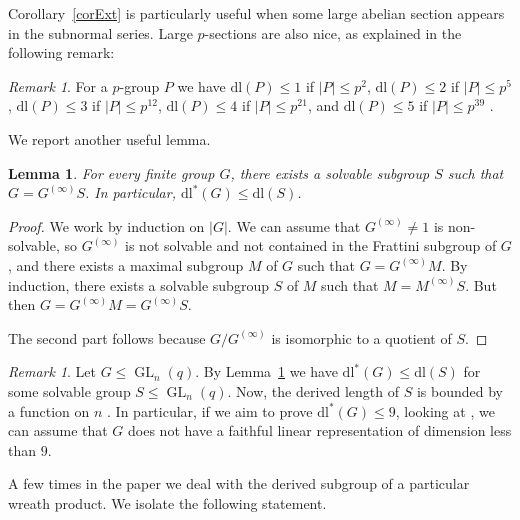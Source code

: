 \documentclass[11pt]{amsart}
\numberwithin{equation}{section}
\newtheorem{lemma}[theorem]{Lemma}
\theoremstyle{definition}
\theoremstyle{remark}
\newtheorem{remark}[theorem]{Remark}
\DeclareMathOperator{\GL}{GL}
\newcommand{\dll}{\mathrm{dl^*}}
\newcommand{\dl}{\mathrm{dl}}
\begin{document}
Corollary~\ref{corExt} is particularly useful when some large abelian section appears in the subnormal series. Large $p$-sections are also nice, as explained in the following remark:

\begin{remark} \label{remP}
For a $p$-group $P$ we have $\dl(P) \leq 1$ if $|P| \leq p^2$,
$\dl(P) \leq 2$ if $|P| \leq p^5$,
$\dl(P) \leq 3$ if $|P| \leq p^{12}$,
$\dl(P) \leq 4$ if $|P| \leq p^{21}$,
and $\dl(P) \leq 5$ if $|P| \leq p^{39}$ \cite{Man00}.
\end{remark}

We report another useful lemma.

\begin{lemma} \label{lemSupp}
For every finite group $G$, there exists a solvable subgroup $S$ such that $G= G^{(\infty)} S$.
In particular, $\dll(G) \leq \dl(S)$.
\end{lemma}
\begin{proof}
We work by induction on $|G|$.
We can assume that $G^{(\infty)} \neq 1$ is non-solvable,
so $G^{(\infty)}$ is not solvable and not contained in the Frattini subgroup of $G$,
and there exists a maximal subgroup $M$ of $G$ such that $G=G^{(\infty)}M$.
By induction, there exists a solvable subgroup $S$ of $M$ such that $M=M^{(\infty)} S$.
But then $G = G^{(\infty)} M = G^{(\infty)} S$.

The second part follows because $G/G^{(\infty)}$ is isomorphic to a quotient of $S$.
\end{proof}

\begin{remark} \label{remRankBound}
Let $G \leqslant \GL_n(q)$.
By Lemma~\ref{lemSupp} we have $\dll(G) \leq \dl(S)$ for some solvable group $S \leqslant \GL_n(q)$.
Now, the derived length of $S$ is bounded by a function on $n$ \cite{New72}.
In particular, if we aim to prove $\dll(G) \leq 9$, looking at \cite[Pag.~70]{New72}, we can assume that $G$ does not have a faithful linear representation of dimension less than $9$.
\end{remark} 

A few times in the paper we deal with the derived subgroup of a particular wreath product. We isolate the following statement.
\end{document}
